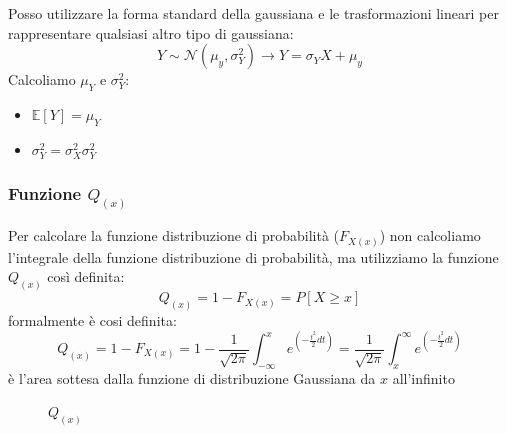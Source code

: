                 Posso utilizzare la forma standard della gaussiana e le trasformazioni lineari per rappresentare qualsiasi altro tipo di gaussiana:
                \[
                    Y\sim \mathcal{N}(\mu_y,\sigma_Y^2) \rightarrow Y = \sigma_Y X + \mu_y
                \]
                Calcoliamo $\mu_Y$ e $\sigma_Y^2$:
                \begin{itemize}
                    \item {$\mathbb{E}[Y] = \mu_Y$}
                    \item {$\sigma_Y^2 = \sigma_X^2 \sigma_Y^2 $}
                \end{itemize}
        \subsubsection{Funzione $Q_{(x)}$}
            Per calcolare la funzione distribuzione di probabilità ($F_{X(x)}$) non calcoliamo l'integrale della funzione distribuzione di probabilità, 
            ma utilizziamo la funzione $Q_{(x)}$ così definita:
            \[
                Q_{(x)} = 1-F_{X(x)} = P[X\geq x]  
            \]
            formalmente è cosi definita:
            \[
                Q_{(x)} = 1-F_{X(x)} = 1 - \frac{1}{\sqrt{2\pi}} \int_{-\infty}^{x}e^{\left(-\frac{t^2}{2}dt\right)} = \frac{1}{\sqrt{2\pi}} \int_{x}^{\infty}e^{\left(-\frac{t^2}{2}dt\right)}  
            \]
            è l'area sottesa dalla funzione di distribuzione Gaussiana da $x$ all'infinito

            \begin{figure}[H]
                \centering
                \caption{\color{red}$Q_{(x)}$}
            \end{figure}
